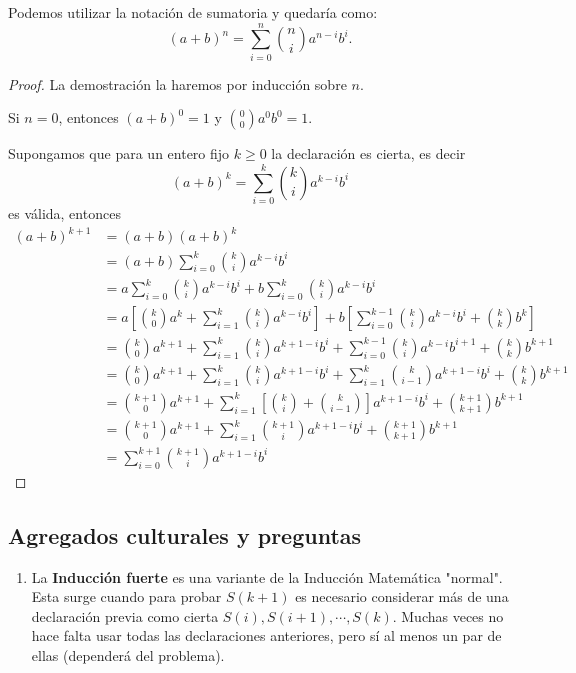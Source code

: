 Podemos utilizar la notación de sumatoria y quedaría como:
\[(a + b)^n = \sum\limits_{i = 0}^{n} \binom{n}{i}a^{n - i}b^i.\]

\begin{proof}
    La demostración la haremos por inducción sobre $n$.

    Si $n = 0$, entonces $(a + b)^0 = 1$ y $\binom{0}{0}a^0 b^0 = 1$.

    Supongamos que para un entero fijo $k \geq 0$ la declaración es cierta, es decir
    \[(a + b)^k = \sum\limits_{i = 0}^{k} \binom{k}{i}a^{k - i}b^i\]
    es válida, entonces
    \begin{align*}
    (a + b)^{k + 1} &= (a + b)(a + b)^k\\
    &= (a + b) \sum\limits_{i = 0}^{k} \binom{k}{i}a^{k - i}b^i\\
        &= a\sum\limits_{i = 0}^{k} \binom{k}{i}a^{k - i}b^i + b\sum\limits_{i = 0}^{k} \binom{k}{i}a^{k - i}b^i\\
        &= a\left[\binom{k}{0}a^{k} + \sum\limits_{i = 1}^{k} \binom{k}{i}a^{k - i}b^i\right] + b\left[\sum\limits_{i = 0}^{k - 1} \binom{k}{i}a^{k - i}b^i + \binom{k}{k}b^k\right]\\
        &= \binom{k}{0}a^{k + 1} + \sum\limits_{i = 1}^{k} \binom{k}{i}a^{k + 1 - i}b^i+ \sum\limits_{i = 0}^{k - 1} \binom{k}{i}a^{k - i}b^{i + 1} + \binom{k}{k}b^{k + 1} \\
        &= \binom{k}{0}a^{k + 1} + \sum\limits_{i = 1}^{k} \binom{k}{i}a^{k + 1 - i}b^i+ \sum\limits_{i = 1}^{k} \binom{k}{i - 1}a^{k + 1 - i}b^{i} + \binom{k}{k}b^{k + 1} \\
        &= \binom{k + 1}{0}a^{k + 1} + \sum\limits_{i = 1}^{k} \left[ \binom{k}{i} + \binom{k}{i - 1}\right] a^{k + 1 - i}b^i + \binom{k + 1}{k + 1}b^{k + 1} \\
        &= \binom{k + 1}{0}a^{k + 1} + \sum\limits_{i = 1}^{k} \binom{k + 1}{i} a^{k + 1 - i}b^i + \binom{k + 1}{k + 1}b^{k + 1} \\
        &= \boxed{\sum\limits_{i = 0}^{k + 1} \binom{k + 1}{i} a^{k + 1 - i}b^i}
    \end{align*}

\end{proof}



\subsection{Agregados culturales y preguntas}

    \begin{enumerate}

        \item La \textbf{Inducción fuerte} es una variante de la Inducción Matemática "normal". Esta surge cuando para probar $S(k + 1)$ es necesario considerar más de una declaración previa como cierta $S(i), S(i + 1), \cdots, S(k)$. Muchas veces no hace falta usar todas las declaraciones anteriores, pero sí al menos un par de ellas (dependerá del problema).
    \end{enumerate}


